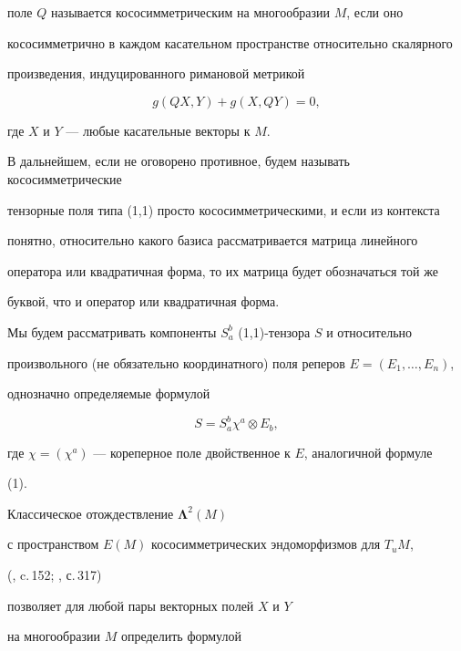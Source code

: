 поле $Q$ называется кососимметрическим на многообразии $M$, если оно


кососимметрично в каждом касательном пространстве относительно скалярного


произведения, индуцированного римановой метрикой


\begin{equation}


g(QX,Y)+g(X,QY)=0,


\end{equation}


где $X$ и $Y$ --- любые касательные векторы к $M$.


В дальнейшем, если не оговорено противное, будем называть кососимметрические


тензорные поля типа (1,1) просто кососимметрическими, и если из контекста


понятно, относительно какого базиса рассматривается матрица линейного


оператора или квадратичная форма, то их матрица будет обозначаться той же


буквой, что и оператор или квадратичная форма.





Мы будем рассматривать компоненты $S^b_a$ (1,1)-тензора $S$ и относительно


произвольного (не обязательно координатного) поля реперов $E=(E_1,\dotsc,E_n)$,


однозначно определяемые формулой


\begin{equation}


S=S^b_a\chi ^a\otimes E_b,


\end{equation}


где $\chi=(\chi^a)$ --- кореперное поле двойственное к $E$, аналогичной формуле


(1).





Классическое отождествление $\boldsymbol\Lambda^2(M)$


с пространством $E(M)$ кососимметрических эндоморфизмов для $T_uM$,


(\cite{Kob1}, c.\,152; \cite{Kob2}, с.\,317)


позволяет для любой пары векторных полей $X$ и $Y$


на многообразии $M$ определить формулой


